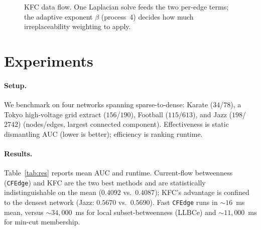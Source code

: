 \documentclass[11pt]{article}
\begin{document}
\begin{figure}[t]
\centering
{}
\caption{KFC data flow. One Laplacian solve feeds the two per-edge terms; the adaptive
exponent $\beta$ (process~4) decides how much irreplaceability weighting to apply.}
\label{fig:pipe}
\end{figure}

\section{Experiments}\label{sec:exp}
\paragraph{Setup.} We benchmark on four networks spanning sparse-to-dense: Karate
($34$/$78$), a Tokyo high-voltage grid extract ($156$/$190$), Football ($115$/$613$),
and Jazz ($198$/$2742$) (nodes/edges, largest connected component). Effectiveness is
static dismantling AUC (lower is better); efficiency is ranking runtime.

\paragraph{Results.} Table~\ref{tab:res} reports mean AUC and runtime. Current-flow
betweenness (\texttt{CFEdge}) and KFC are the two best methods and are statistically
indistinguishable on the mean ($0.4092$ vs.\ $0.4087$); KFC's advantage is confined to
the densest network (Jazz: $0.5670$ vs.\ $0.5690$). Fast \texttt{CFEdge} runs in
$\sim\!16$~ms mean, versus $\sim\!34{,}000$~ms for local subset-betweenness (LLBCe) and
$\sim\!11{,}000$~ms for min-cut membership.
\end{document}
